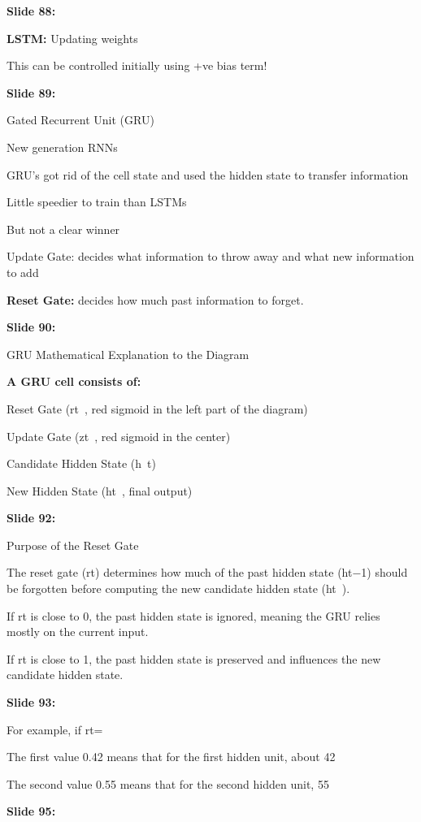 \documentclass[11pt,a4paper]{article}
\begin{document}
\textbf{Slide 88:}

\textbf{LSTM:}  Updating weights

This can be controlled initially using +ve bias term!

\textbf{Slide 89:}

Gated Recurrent Unit (GRU)

New generation RNNs

GRU’s got rid of the cell state and used the hidden state to transfer information

Little speedier to train than LSTMs

But not a clear winner

Update Gate: decides what information to throw away and what new information to add

\textbf{Reset Gate:}  decides how much past information to forget.

\textbf{Slide 90:}

GRU Mathematical Explanation to the Diagram

\textbf{A GRU cell consists of:} 

Reset Gate (rt , red sigmoid in the left part of the diagram)

Update Gate (zt , red sigmoid in the center)

Candidate Hidden State (h~t)

New Hidden State (ht , final output)

\textbf{Slide 92:}

Purpose of the Reset Gate

The reset gate (rt​) determines how much of the past hidden state (ht−1​) should be forgotten before computing the new candidate hidden state (ht~​).

If rt is close to 0, the past hidden state is ignored, meaning the GRU relies mostly on the current input.

If rt is close to 1, the past hidden state is preserved and influences the new candidate hidden state.

\textbf{Slide 93:}

For example, if rt=

The first value 0.42 means that for the first hidden unit, about 42%

The second value 0.55 means that for the second hidden unit, 55%

\textbf{Slide 95:}
\end{document}
